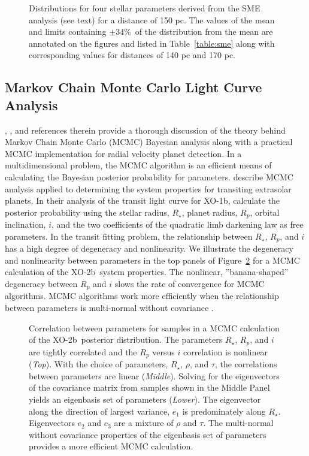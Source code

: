 \documentclass{emulateapj}
\newcommand{\xonb}{XO-2b}
\begin{document}
\begin{figure}
\caption{Distributions for four stellar parameters derived from the
SME analysis (see text) for a distance of 150 pc. The values of
the mean and limits containing $\pm34$\%\ of the distribution from the mean
are annotated on the figures and listed in
Table~\ref{table:sme} along with
corresponding values for distances of 140 pc and 170 pc.\label{fig:smeiso}}
\end{figure}

\subsection{Markov Chain Monte Carlo Light Curve Analysis}\label{sec:lcmcmc}

\citet{FORD05}, \citet{GRE05}, and references therein provide a
thorough discussion of the theory behind Markov Chain Monte Carlo
(MCMC) Bayesian analysis along with a practical MCMC implementation
for radial velocity planet detection.  In a multidimensional problem,
the MCMC algorithm is an efficient means of calculating the Bayesian
posterior probability for parameters.  \citet{HOL06} describe MCMC
analysis applied to determining the system properties for transiting
extrasolar planets.  In their analysis of the transit light curve for
XO-1b, \citet{HOL06} calculate the posterior probability using the
stellar radius, $R_{\star}$, planet radius, $R_{p}$, orbital
inclination, $i$, and the two coefficients of the quadratic limb
darkening law as free parameters.  In the transit fitting problem, the
relationship between $R_{\star}$, $R_{p}$, and $i$ has a high degree
of degeneracy and nonlinearity.  We illustrate the degeneracy and
nonlinearity between parameters in the top panels of
Figure~\ref{tranfig} for a MCMC calculation of the \xonb\ system
properties.  The nonlinear, ''banana-shaped'' degeneracy between
$R_{p}$ and $i$ slows the rate of convergence for MCMC algorithms.
MCMC algorithms work more efficiently when the relationship between
parameters is multi-normal without covariance
\citep{KOS02}.

\begin{figure}
\caption{Correlation between parameters for samples in a MCMC calculation of the \xonb\ posterior distribution.  The parameters $R_{\star}$, $R_{p}$, and $i$ are tightly correlated and the $R_{p}$ versus $i$ correlation is nonlinear ({\it Top}).  With the choice of parameters, $R_{\star}$, $\rho$, and $\tau$, the correlations between parameters are linear ({\it Middle}).  Solving for the eigenvectors of the covariance matrix from samples shown in the Middle Panel yields an eigenbasis set of parameters ({\it Lower}).  The eigenvector along the direction of largest variance, $e_{1}$ is predominately along $R_{\star}$.  Eigenvectors $e_{2}$ and $e_{3}$ are a mixture of $\rho$ and $\tau$.  The multi-normal without covariance properties of the eigenbasis set of parameters provides a more efficient MCMC calculation.\label{tranfig}}
\end{figure}
\end{document}
